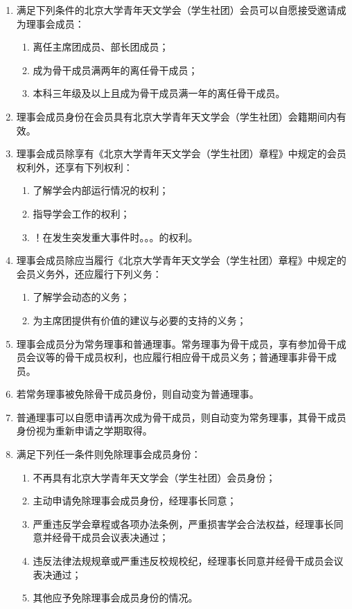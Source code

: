 \begin{enumerate}[resume]
    \item 满足下列条件的北京大学青年天文学会（学生社团）会员可以自愿接受邀请成为理事会成员：\label{item:council}
    \begin{enumerate}
        \item 离任主席团成员、部长团成员；
        \item 成为骨干成员满两年的离任骨干成员；
        \item 本科三年级及以上且成为骨干成员满一年的离任骨干成员。
    \end{enumerate}

    \item 理事会成员身份在会员具有北京大学青年天文学会（学生社团）会籍期间内有效。
    
    \item 理事会成员除享有《北京大学青年天文学会（学生社团）章程》中规定的会员权利外，还享有下列权利：
    \begin{enumerate}
        \item 了解学会内部运行情况的权利；
        \item 指导学会工作的权利；
        \item ！在发生突发重大事件时。。。的权利。
    \end{enumerate}

    \item 理事会成员除应当履行《北京大学青年天文学会（学生社团）章程》中规定的会员义务外，还应履行下列义务：
    \begin{enumerate}
        \item 了解学会动态的义务；
        \item 为主席团提供有价值的建议与必要的支持的义务；
    \end{enumerate}

    \item 理事会成员分为常务理事和普通理事。常务理事为骨干成员，享有参加骨干成员会议等的骨干成员权利，也应履行相应骨干成员义务；普通理事非骨干成员。
    
    \item 若常务理事被免除骨干成员身份，则自动变为普通理事。
    
    \item 普通理事可以自愿申请再次成为骨干成员，则自动变为常务理事，其骨干成员身份视为重新申请之学期取得。
    
    \item 满足下列任一条件则免除理事会成员身份：
    \begin{enumerate}
        \item 不再具有北京大学青年天文学会（学生社团）会员身份；
        \item 主动申请免除理事会成员身份，经理事长同意；
        \item 严重违反学会章程或各项办法条例，严重损害学会合法权益，经理事长同意并经骨干成员会议表决通过；
        \item 违反法律法规规章或严重违反校规校纪，经理事长同意并经骨干成员会议表决通过；
        \item 其他应予免除理事会成员身份的情况。
    \end{enumerate}

\end{enumerate}

